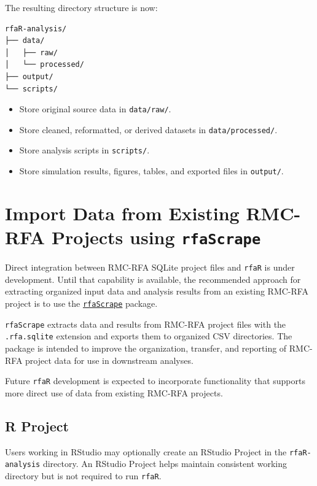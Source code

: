 \documentclass[
  letterpaper,
  DIV=11,
  numbers=noendperiod]{scrreprt}
\providecommand{\tightlist}{%
  \setlength{\itemsep}{0pt}\setlength{\parskip}{0pt}}
\begin{document}
The resulting directory structure is now:

\begin{verbatim}
rfaR-analysis/
├── data/
│   ├── raw/
│   └── processed/
├── output/
└── scripts/
\end{verbatim}

\begin{itemize}
\tightlist
\item
  Store original source data in \texttt{data/raw/}.
\item
  Store cleaned, reformatted, or derived datasets in
  \texttt{data/processed/}.
\item
  Store analysis scripts in \texttt{scripts/}.
\item
  Store simulation results, figures, tables, and exported files in
  \texttt{output/}.
\end{itemize}

\section{\texorpdfstring{Import Data from Existing RMC-RFA Projects
using
\texttt{rfaScrape}}{Import Data from Existing RMC-RFA Projects using rfaScrape}}\label{import-data-from-existing-rmc-rfa-projects-using-rfascrape}

Direct integration between RMC-RFA SQLite project files and
\texttt{rfaR} is under development. Until that capability is available,
the recommended approach for extracting organized input data and
analysis results from an existing RMC-RFA project is to use the
\href{https://github.com/danmcgraw94/rfaScrape}{\texttt{rfaScrape}}
package.

\texttt{rfaScrape} extracts data and results from RMC-RFA project files
with the \texttt{.rfa.sqlite} extension and exports them to organized
CSV directories. The package is intended to improve the organization,
transfer, and reporting of RMC-RFA project data for use in downstream
analyses.

Future \texttt{rfaR} development is expected to incorporate
functionality that supports more direct use of data from existing
RMC-RFA projects.

\subsection{R Project}\label{r-project}

Users working in RStudio may optionally create an RStudio Project in the
\texttt{rfaR-analysis} directory. An RStudio Project helps maintain
consistent working directory but is not required to run \texttt{rfaR}.
\end{document}

